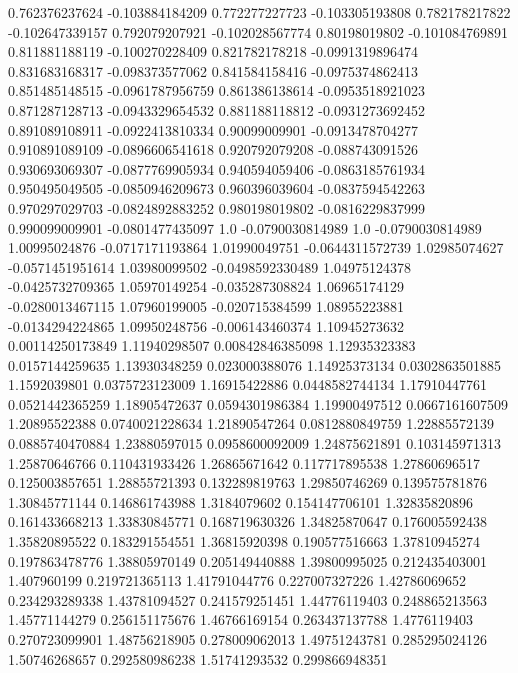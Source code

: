  0.762376237624  -0.103884184209
 0.772277227723  -0.103305193808
 0.782178217822  -0.102647339157
 0.792079207921  -0.102028567774
  0.80198019802  -0.101084769891
 0.811881188119  -0.100270228409
 0.821782178218  -0.0991319896474
 0.831683168317  -0.098373577062
 0.841584158416  -0.0975374862413
 0.851485148515  -0.0961787956759
 0.861386138614  -0.0953518921023
 0.871287128713  -0.0943329654532
 0.881188118812  -0.0931273692452
 0.891089108911  -0.0922413810334
  0.90099009901  -0.0913478704277
 0.910891089109  -0.0896606541618
 0.920792079208  -0.088743091526
 0.930693069307  -0.0877769905934
 0.940594059406  -0.0863185761934
 0.950495049505  -0.0850946209673
 0.960396039604  -0.0837594542263
 0.970297029703  -0.0824892883252
 0.980198019802  -0.0816229837999
 0.990099009901  -0.0801477435097
            1.0  -0.0790030814989
            1.0  -0.0790030814989
  1.00995024876  -0.0717171193864
  1.01990049751  -0.0644311572739
  1.02985074627  -0.0571451951614
  1.03980099502  -0.0498592330489
  1.04975124378  -0.0425732709365
  1.05970149254  -0.035287308824
  1.06965174129  -0.0280013467115
  1.07960199005  -0.020715384599
  1.08955223881  -0.0134294224865
  1.09950248756  -0.006143460374
  1.10945273632  0.00114250173849
  1.11940298507  0.00842846385098
  1.12935323383  0.0157144259635
  1.13930348259   0.023000388076
  1.14925373134  0.0302863501885
   1.1592039801  0.0375723123009
  1.16915422886  0.0448582744134
  1.17910447761  0.0521442365259
  1.18905472637  0.0594301986384
  1.19900497512  0.0667161607509
  1.20895522388  0.0740021228634
  1.21890547264  0.0812880849759
  1.22885572139  0.0885740470884
  1.23880597015  0.0958600092009
  1.24875621891   0.103145971313
  1.25870646766   0.110431933426
  1.26865671642   0.117717895538
  1.27860696517   0.125003857651
  1.28855721393   0.132289819763
  1.29850746269   0.139575781876
  1.30845771144   0.146861743988
   1.3184079602   0.154147706101
  1.32835820896   0.161433668213
  1.33830845771   0.168719630326
  1.34825870647   0.176005592438
  1.35820895522   0.183291554551
  1.36815920398   0.190577516663
  1.37810945274   0.197863478776
  1.38805970149   0.205149440888
  1.39800995025   0.212435403001
    1.407960199   0.219721365113
  1.41791044776   0.227007327226
  1.42786069652   0.234293289338
  1.43781094527   0.241579251451
  1.44776119403   0.248865213563
  1.45771144279   0.256151175676
  1.46766169154   0.263437137788
   1.4776119403   0.270723099901
  1.48756218905   0.278009062013
  1.49751243781   0.285295024126
  1.50746268657   0.292580986238
  1.51741293532   0.299866948351
